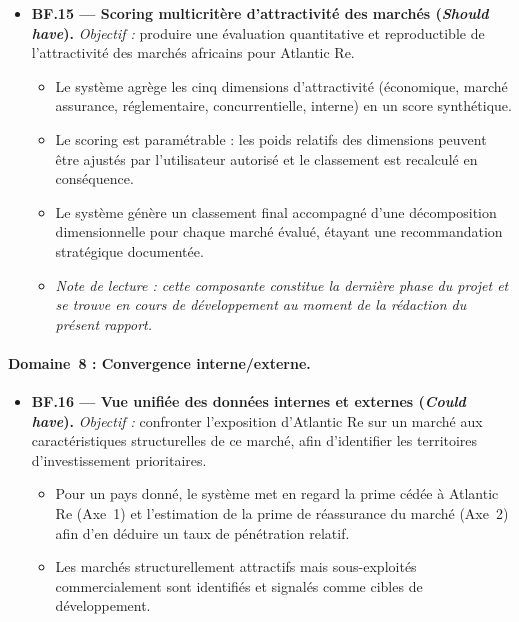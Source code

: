 \documentclass[../main.tex]{subfiles}
\begin{document}
\begin{itemize}[leftmargin=1.5cm, itemsep=6pt]

  \item \textbf{BF.15 --- Scoring multicritère d'attractivité des marchés (\textit{Should have}).}
  \emph{Objectif :} produire une évaluation quantitative et reproductible de l'attractivité des marchés africains pour Atlantic Re.
  \begin{itemize}[label=\textendash, itemsep=2pt]
    \item Le système agrège les cinq dimensions d'attractivité (économique, marché assurance, réglementaire, concurrentielle, interne) en un score synthétique.
    \item Le scoring est paramétrable : les poids relatifs des dimensions peuvent être ajustés par l'utilisateur autorisé et le classement est recalculé en conséquence.
    \item Le système génère un classement final accompagné d'une décomposition dimensionnelle pour chaque marché évalué, étayant une recommandation stratégique documentée.
    \item \textit{Note de lecture : cette composante constitue la dernière phase du projet et se trouve en cours de développement au moment de la rédaction du présent rapport.}
  \end{itemize}

\end{itemize}

\paragraph{Domaine~8 : Convergence interne/externe.}

\begin{itemize}[leftmargin=1.5cm, itemsep=6pt]

  \item \textbf{BF.16 --- Vue unifiée des données internes et externes (\textit{Could have}).}
  \emph{Objectif :} confronter l'exposition d'Atlantic Re sur un marché aux caractéristiques structurelles de ce marché, afin d'identifier les territoires d'investissement prioritaires.
  \begin{itemize}[label=\textendash, itemsep=2pt]
    \item Pour un pays donné, le système met en regard la prime cédée à Atlantic Re (Axe~1) et l'estimation de la prime de réassurance du marché (Axe~2) afin d'en déduire un taux de pénétration relatif.
    \item Les marchés structurellement attractifs mais sous-exploités commercialement sont identifiés et signalés comme cibles de développement.
  \end{itemize}

\end{itemize}
\end{document}
